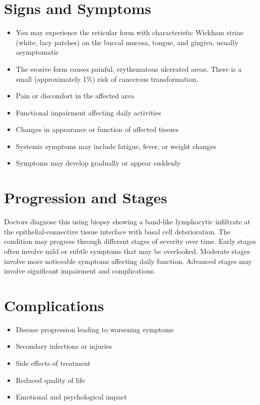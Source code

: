 \section{Signs and Symptoms}
\begin{itemize}[noitemsep]
  \item You may experience the reticular form with characteristic Wickham striae (white, lacy patches) on the buccal mucosa, tongue, and gingiva, usually asymptomatic
  \item The erosive form causes painful, erythematous ulcerated areas. There is a small (approximately 1\%) risk of cancerous transformation.
  \item Pain or discomfort in the affected area
  \item Functional impairment affecting daily activities
  \item Changes in appearance or function of affected tissues
  \item Systemic symptoms may include fatigue, fever, or weight changes
  \item Symptoms may develop gradually or appear suddenly
\end{itemize}
\section{Progression and Stages}
Doctors diagnose this using biopsy showing a band-like lymphocytic infiltrate at the epithelial-connective tissue interface with basal cell deterioration. The condition may progress through different stages of severity over time. Early stages often involve mild or subtle symptoms that may be overlooked. Moderate stages involve more noticeable symptoms affecting daily function. Advanced stages may involve significant impairment and complications.
\section{Complications}
\begin{itemize}[noitemsep]
  \item Disease progression leading to worsening symptoms
  \item Secondary infections or injuries
  \item Side effects of treatment
  \item Reduced quality of life
  \item Emotional and psychological impact
\end{itemize}
